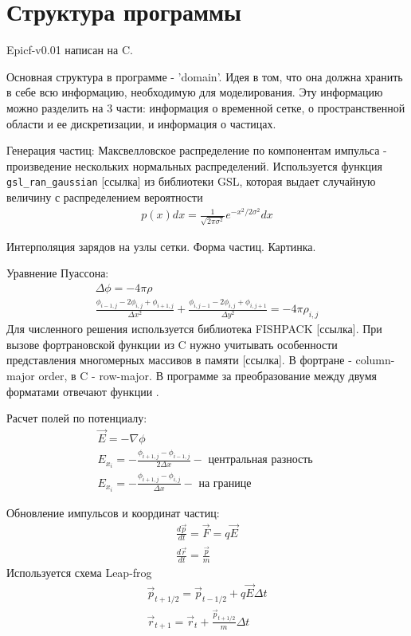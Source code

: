 \section{Структура программы}

Epicf-v0.01 написан на C. 

Основная структура в программе - 'domain'.
Идея в том, что она должна хранить в себе всю информацию, необходимую для 
моделирования. Эту информацию можно разделить на 3 части: информация о 
временной сетке, о пространственной области и ее дискретизации, и информация о частицах.

Генерация частиц:
Максвелловское распределение по компонентам импульса - произведение
нескольких нормальных распределений. Используется функция \texttt{gsl\_ran\_gaussian} [ссылка]
из библиотеки GSL, которая выдает случайную величину с распределением вероятности
\begin{gather}
  p(x) dx = \frac{1}{\sqrt{2 \pi \sigma^2}} e^{-x^2 / 2\sigma^2} dx
\end{gather}


Интерполяция зарядов на узлы сетки. Форма частиц. Картинка. 

Уравнение Пуассона:
\begin{gather}
  \Delta \phi = - 4 \pi \rho  
  \\
  \frac{ \phi_{i-1,j} - 2 \phi_{i,j} + \phi_{i+1,j} }{ \Delta x^2 }
  + 
  \frac{ \phi_{i,j-1} - 2 \phi_{i,j} + \phi_{i,j+1} }{ \Delta y^2 }
  =
  -4 \pi \rho_{i,j}
\end{gather}
Для численного решения используется библиотека FISHPACK [ссылка]. 
При вызове фортрановской функции из C нужно учитывать особенности 
представления многомерных массивов в памяти [ссылка].
В фортране - column-major order, в C - row-major. 
В программе за преобразование между двумя форматами отвечают функции .

Расчет полей по потенциалу:
\begin{gather}
  \vec{ E } = - \nabla \phi
  \\
  E_{x_i} =  - \frac{ \phi_{i+1,j} - \phi_{i-1,j} }{ 2 \Delta x }  - \mbox{ центральная разность }
  \\
  E_{x_i} =  - \frac{ \phi_{i+1,j} - \phi_{i,j} }{ \Delta x } - \mbox{ на границе }
\end{gather}

Обновление импульсов и координат частиц:
\begin{gather}
  \frac{ d \vec{p} }{ d t } = \vec{ F } = q \vec{ E }
  \\
  \frac{ d \vec{r} }{ d t } = \frac{ \vec{p} }{ m }
\end{gather}
Используется схема Leap-frog
\begin{gather}
  \vec{p}_{t+1/2} = \vec{p}_{t-1/2} + q \vec{E} \Delta t  
  \\
  \vec{r}_{t+1} = \vec{r}_{t} + \frac{ \vec{p}_{t+1/2} }{ m } \Delta t
\end{gather}

